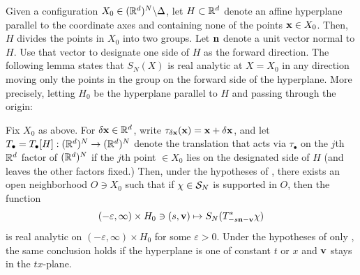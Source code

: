  
Given a configuration $X_0\in (\mathbb{R}^d)^N\backslash \Delta$, let
$H\subset\mathbb{R}^d$ denote an affine hyperplane parallel to the coordinate axes and containing none of the points $\mathbf{x}\in X_0$. Then, $H$ divides the points in $X_0$ into two groups. Let $\mathbf{n}$ denote a unit vector normal to $H$. Use that vector to designate one side of $H$ as the forward direction.
The following lemma states that $S_N(X)$ is real analytic at $X=X_0$ in any direction moving only the points in the group on the forward side of the hyperplane. More precisely, letting $H_0$ be the hyperplane parallel to $H$ and passing through the origin:
\begin{lemma}\label{lem:reduction} 
Fix $X_0$ as above. 
For $\delta\mathbf{x}\in\mathbb{R}^d$, write
$\tau_{\delta\mathbf{x}}(\mathbf{x})=\mathbf{x}+\delta\mathbf{x}$, and let $T_{\bullet}=T_\bullet[H]:(\mathbb{R}^d)^N\to (\mathbb{R}^d)^N$ denote the translation that acts via $\tau_{\bullet}$ on the $j$th $\mathbb{R}^d$ factor of $(\mathbb{R}^d)^N$ if the $j$th point $\in X_0$ lies on the designated side of $H$ (and leaves the other factors fixed.) Then, under the hypotheses of ,  there exists an open neighborhood $O\ni X_0$ such that if $\chi\in \mathcal{S}_N$ is supported in $O$, then the function 
\begin{equation}
    (-\varepsilon,\infty) \times H_0\ni (s, \mathbf{v}) \mapsto S_N(T^*_{-s \mathbf{n} - \mathbf{v} } \chi)
\end{equation}
is real analytic on $(-\varepsilon, \infty)\times H_0$ for some $\varepsilon>0$. 
Under the hypotheses of only , the same conclusion holds if the hyperplane is one of constant $t$ or $x$ and $\mathbf{v}$ stays in the $tx$-plane. 
\end{lemma}



